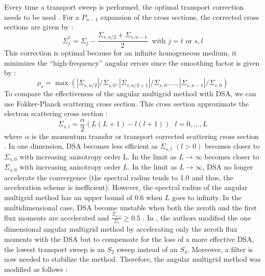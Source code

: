 Every time a transport sweep is performed, the optimal transport correction
needs to be used \cite{multigrid_1d}. For a $P_{n-1}$ expansion of the cross
sections, the corrected cross sections are given by :
\begin{equation}
\Sigma_{j}^* = \Sigma_{j} -\frac{\Sigma_{s,n/2}+\Sigma_{s,n-1}}{2}\ 
\textrm{ with }j=t \textrm{ or }s,l
\end{equation}
This correction is optimal because for an infinite homogeneous medium, it minimizes 
the ``high-frequency'' angular errors since the smoothing factor is given by :
\begin{equation}
\rho_s =
\max(|\Sigma_{s,n/2}|/\Sigma_{s,0},|\Sigma_{s,n/2+1}|/\Sigma_{s,0},\hdots,
|\Sigma_{s,n-1}|/\Sigma_{s,0})
\end{equation}
To compare the effectiveness of the angular multigrid method with DSA, we can
use Fokker-Planck scattering cross section. This cross section approximate 
the electron scattering cross section :
\begin{equation}
\Sigma_{s,l} = \frac{\alpha}{2} (L(L+1)-l(l+1))\ \ \ l=0,\hdots,L
\end{equation}
where $\alpha$ is the momentum transfer or transport corrected scattering
cross section \cite{multigrid_1d,morel_81}. In one dimension,
DSA becomes less efficient as $\Sigma_{s,l}$ $(l>0)$ becomes closer to
$\Sigma_{s,0}$ with increasing anisotropy order L. In the limit as
$L\rightarrow \infty$ becomes closer to $\Sigma_{s,0}$ with increasing
anisotropy order $L$. In the limit as $L\rightarrow \infty$, DSA no
longer accelerate the convergence (the spectral radius tends to 1.0 and thus,
the acceleration scheme is inefficient). However, the spectral radius of the
angular multigrid method has an upper bound of 0.6 when $L$ goes to infinity.
In the multidimensional case, DSA become unstable when both the zeroth
and the first flux moments are accelerated and $\frac{\Sigma_{s,1}}{\Sigma_t}
\geq 0.5$ \cite{multisweep}. In \cite{multigrid_2d}, the authors modified the
one dimensional angular multigrid method by accelerating only the zeroth flux
moments with the DSA but to compensate for the loss of a more effective DSA,
the lowest transport sweep is an $S_2$ sweep instead of an $S_4$. Moreover, a
filter is now needed to stabilize the method. Therefore, the angular multigrid 
method was modified as follows \cite{multigrid_2d} :
